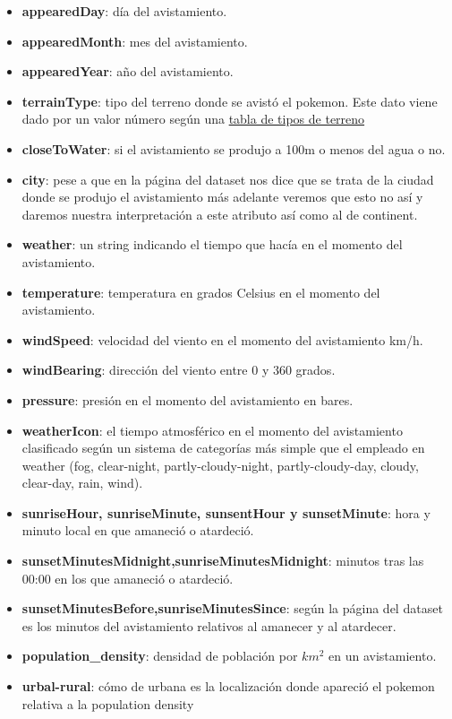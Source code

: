 \begin{itemize}
\item \textbf{appearedDay}: día del avistamiento.

\item \textbf{appearedMonth}: mes del avistamiento.

\item \textbf{appearedYear}: año del avistamiento.

\item \textbf{terrainType}: tipo del terreno donde se avistó el pokemon. Este dato viene dado por un valor número según una \href{http://glcf.umd.edu/data/lc}{tabla de tipos de terreno}

\item \textbf{closeToWater}: si el avistamiento se produjo a 100m o menos del agua o no.

\item \textbf{city}: pese a que en la página del dataset nos dice que se trata de la ciudad donde se produjo el avistamiento más adelante veremos que esto no así y daremos nuestra interpretación a este atributo así como al de continent.
 
\item \textbf{weather}: un string indicando el tiempo que hacía en el momento del avistamiento.
 
\item \textbf{temperature}: temperatura en grados Celsius en el momento del avistamiento.

\item \textbf{windSpeed}: velocidad del viento en el momento del avistamiento km/h.

\item \textbf{windBearing}: dirección del viento entre 0 y 360 grados.

\item \textbf{pressure}: presión en el momento del avistamiento en bares.

\item \textbf{weatherIcon}: el tiempo atmosférico en el momento del avistamiento clasificado según un sistema de categorías más simple que el empleado en weather (fog, clear-night, partly-cloudy-night, partly-cloudy-day, cloudy, clear-day, rain, wind).

\item \textbf{sunriseHour, sunriseMinute, sunsentHour y sunsetMinute}: hora y minuto local en que amaneció o atardeció.

\item \textbf{sunsetMinutesMidnight,sunriseMinutesMidnight}: minutos tras las 00:00 en los que amaneció o atardeció.

\item \textbf{sunsetMinutesBefore,sunriseMinutesSince}: según la página del dataset es los minutos del avistamiento relativos al amanecer y al atardecer.
 
\item \textbf{population\_density}: densidad de población por $km^2$ en un avistamiento.

\item \textbf{urbal-rural}: cómo de urbana es la localización donde apareció el pokemon relativa a la population density


\end{itemize}